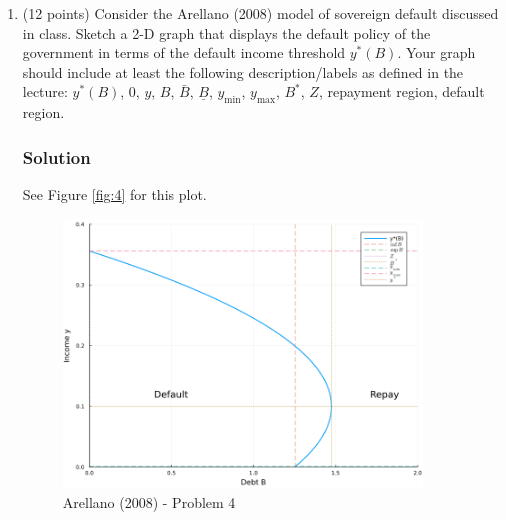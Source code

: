 \documentclass[12pt]{article}
\begin{document}
\begin{enumerate}
\begin{enumerate}[label=(\alph*)]
    \end{enumerate}

    \item (12 points) Consider the Arellano (2008) model of sovereign default discussed in class. Sketch a 2-D graph that displays the default policy of the government in terms of the default income threshold $y^*(B)$. Your graph should include at least the following description/labels as defined in the lecture: $y^*(B)$, 0, $y$, $B$, $\bar{B}$, $\underline{B}$, $y_{\min}$, $y_{\max}$, $B^*$, $Z$, repayment region, default region.
    \subsubsection*{Solution}

    See Figure \eqref{fig:4} for this plot.
    \begin{figure}[h]
            \centering
                \includegraphics[width=0.9\textwidth]{pset2/q4.png}
                \caption{Arellano (2008) - Problem 4}
                \label{fig:4}
        \end{figure}


\end{enumerate}
\end{document}
